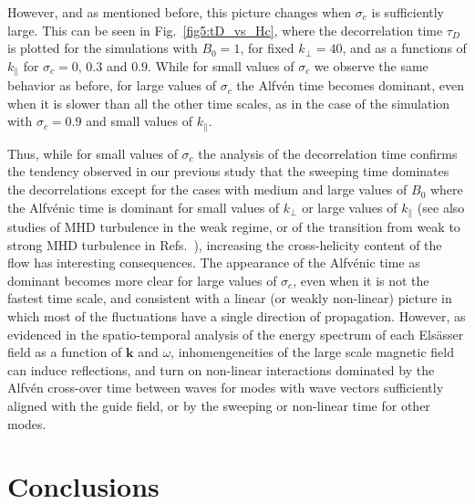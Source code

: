 \documentclass[aip,pop,reprint,amsmath,amssymb,floatfix]{revtex4-1}
\renewcommand{\vec}[1]{\mathbf{#1}}
\begin{document}
However, and as mentioned before, this picture changes when $\sigma_c$ is
sufficiently large. This can be seen in Fig.~\ref{fig5:tD_vs_Hc},
where the decorrelation time $\tau_D$ is plotted for the simulations
with $B_0=1$, for fixed $k_\perp=40$, and as a functions of
$k_\parallel$ for $\sigma_c = 0$, $0.3$ and $0.9$. While for small values
of $\sigma_c$ we observe the same behavior as before, for large values of
$\sigma_c$ the Alfv\'en time becomes dominant, even when it is slower than
all the other time scales, as in the case of the simulation with
$\sigma_c=0.9$ and small values of $k_\parallel$.

Thus, while for small values of $\sigma_c$ the analysis of the
decorrelation time confirms the tendency observed in our previous
study \cite{lugones_2016_spatiotemporal} that the sweeping time
dominates the decorrelations except for the cases with medium and
large values of $B_0$ where the Alfv\'enic time is dominant for small
values of $k_{\perp}$ or large values of $k_{\parallel}$ (see also
studies of MHD turbulence in the weak regime, or of the transition
from weak to strong MHD turbulence in Refs.~\cite{meyrand_weak_2015,
  lugones_2016_spatiotemporal, meyrand_direct_2016}), increasing the
cross-helicity content of the flow has interesting consequences. The
appearance of the Alfv\'enic time as dominant becomes more clear for
large values of $\sigma_c$, even when it is not the fastest time scale, and
consistent with a linear (or weakly non-linear) picture in which most
of the fluctuations have a single direction of propagation. However,
as evidenced in the spatio-temporal analysis of the energy spectrum of
each Els\"asser field as a function of $\vec{k}$ and $\omega$,
inhomengeneities of the large scale magnetic field can induce
reflections, and turn on non-linear interactions dominated by the
Alfv\'en cross-over time between waves for modes with wave vectors
sufficiently aligned with the guide field, or by the sweeping or
non-linear time for other modes.

\section{Conclusions}\label{sec_Conclusions}
\end{document}
